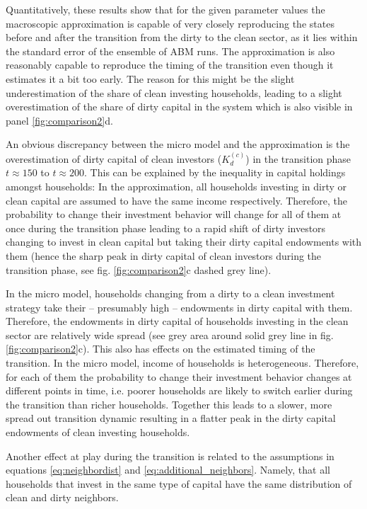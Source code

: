 Quantitatively, these results show that for the given parameter values the macroscopic approximation is capable of very closely reproducing the states before and after the transition from the dirty to the clean sector, as it lies within the standard error of the ensemble of ABM runs.
The approximation is also reasonably capable to reproduce the timing of the transition even though it estimates it a bit too early. The reason for this might be the slight underestimation of the share of clean investing households, leading to a slight overestimation of the share of dirty capital in the system which is also visible in panel \ref{fig:comparison2}d.

An obvious discrepancy between the micro model and the approximation is the overestimation of dirty capital of clean investors ($K_d^{(c)}$) in the transition phase $t\approx 150$ to $t \approx 200$. This can be explained by the inequality in capital holdings amongst households: In the approximation, all households investing in dirty or clean capital are assumed to have the same income respectively. Therefore, the probability to change their investment behavior will change for all of them at once during the transition phase leading to a rapid shift of dirty investors changing to invest in clean capital but taking their dirty capital endowments with them (hence the sharp peak in dirty capital of clean investors during the transition phase, see fig.  \ref{fig:comparison2}c dashed grey line).

In the micro model, households changing from a dirty to a clean investment strategy take their -- presumably high -- endowments in dirty capital with them. Therefore, the endowments in dirty capital of households investing in the clean sector are relatively wide spread (see grey area around solid grey line in fig. \ref{fig:comparison2}c). 
This also has effects on the estimated timing of the transition. In the micro model, income of households is heterogeneous. Therefore, for each of them the probability to change their investment behavior changes at different points in time, i.e. poorer households are likely to switch earlier during the transition than richer households. Together this leads to a slower, more spread out transition dynamic resulting in a flatter peak in the dirty capital endowments of clean investing households.

Another effect at play during the transition is related to the assumptions in equations \ref{eq:neighbordist} and \ref{eq:additional_neighbors}. Namely, that all households that invest in the same type of capital have the same distribution of clean and dirty neighbors.

